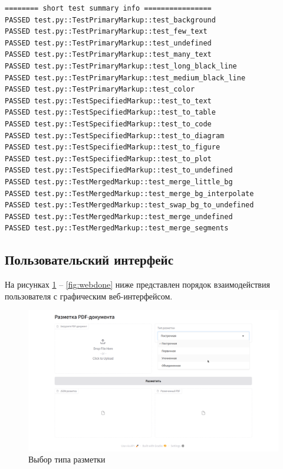 \begin{lstlisting}[caption={Результаты тестирования}, label={lst:test}]
======== short test summary info ================
PASSED test.py::TestPrimaryMarkup::test_background
PASSED test.py::TestPrimaryMarkup::test_few_text
PASSED test.py::TestPrimaryMarkup::test_undefined
PASSED test.py::TestPrimaryMarkup::test_many_text
PASSED test.py::TestPrimaryMarkup::test_long_black_line
PASSED test.py::TestPrimaryMarkup::test_medium_black_line
PASSED test.py::TestPrimaryMarkup::test_color
PASSED test.py::TestSpecifiedMarkup::test_to_text
PASSED test.py::TestSpecifiedMarkup::test_to_table
PASSED test.py::TestSpecifiedMarkup::test_to_code
PASSED test.py::TestSpecifiedMarkup::test_to_diagram
PASSED test.py::TestSpecifiedMarkup::test_to_figure
PASSED test.py::TestSpecifiedMarkup::test_to_plot
PASSED test.py::TestSpecifiedMarkup::test_to_undefined
PASSED test.py::TestMergedMarkup::test_merge_little_bg
PASSED test.py::TestMergedMarkup::test_merge_bg_interpolate
PASSED test.py::TestMergedMarkup::test_swap_bg_to_undefined
PASSED test.py::TestMergedMarkup::test_merge_undefined
PASSED test.py::TestMergedMarkup::test_merge_segments
\end{lstlisting}

\newpage

\subsection{Пользовательский интерфейс}


На рисунках \ref{fig:webstart} -- \ref{fig:webdone} ниже представлен порядок взаимодействия пользователя с графическим веб-интерфейсом.

\begin{figure}[H]
	\centering
	\includegraphics[width=\textwidth]{img/web-start.png}
    \caption{Выбор типа разметки}
	\label{fig:webstart}
\end{figure}

